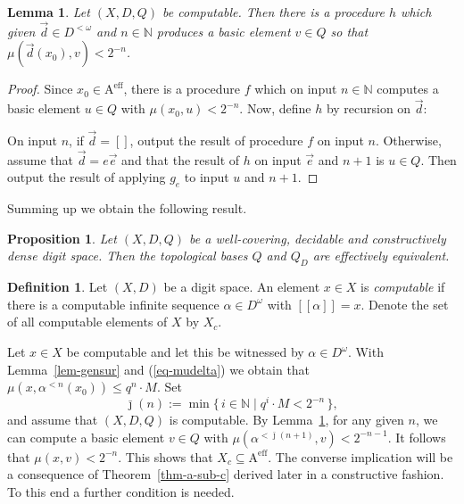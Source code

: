 \documentclass[microtype]{jloganal}
\theoremstyle{plain}
\newtheorem{lemma}[theorem]{Lemma}
\newtheorem{proposition}[theorem]{Proposition}
\theoremstyle{definition}
\newtheorem{definition}[theorem]{Definition}
\newcommand{\NN}{\mathbb{N}}
\newcommand{\val}[1]{[\![#1]\!]}
\newcommand{\set}[2]{\mbox{$\{\,#1 \mid #2 \,\}$}}
\newcommand{\cauchy}{\mathrm{A}}
\begin{document}
\begin{lemma}
\label{lem-QD-Q}
Let $(X, D, Q)$ be computable. Then there is a procedure $h$ which given $\vec d \in D^{< \omega}$ and $n \in \NN$ produces a basic element $v \in Q$ so that $\mu(\vec d(x_0), v) < 2^{-n}$.
\end{lemma}
\begin{proof}
Since $x_0 \in \cauchy^\text{eff}$, there is a procedure $f$ which on input $n \in \NN$ computes a basic element $u \in Q$ with $\mu(x_0, u) < 2^{-n}$. Now, define $h$ by recursion on $\vec d$:

On input $n$, if $\vec d = []$, output the result of procedure $f$ on input $n$. Otherwise, assume that $\vec d = e\vec e$ and that the result of $h$ on input $\vec e$ and $n+1$ is $u \in Q$. Then output the result of applying $g_e$ to input $u$ and $n+1$. 
\end{proof}

Summing up we obtain the following result.

\begin{proposition}\label{prop-baseeq}
Let $(X, D, Q)$ be a well-covering, decidable and constructively dense digit space. Then the topological bases $Q$ and $Q_D$ are effectively equivalent.
\end{proposition}

\begin{definition}
\label{def-computable-element}
Let $(X,D)$ be a digit space. An element $x \in X$ is \emph{computable} if there is a computable infinite sequence $\alpha \in D^\omega$ with $\val{\alpha} = x$. Denote the set of all computable elements of $X$ by $X_c$.
\end{definition}

Let $x \in X$ be computable and let this be witnessed by $\alpha \in D^\omega$. With Lemma~\ref{lem-gensur} and (\ref{eq-mudelta}) we obtain that $\mu(x, \alpha^{<n}(x_0)) \le q^n \cdot M$. Set 
\[
\bar{\jmath}(n) := \min\set{i \in \NN}{q^i \cdot M < 2^{-n}},
\]
and assume that $(X, D, Q)$ is computable. By Lemma~\ref{lem-QD-Q}, for any given $n$, we can compute a basic element $v \in Q$ with $\mu(\alpha^{< \bar{\jmath}(n+1)}, v) < 2^{-n-1}$. It follows that $\mu(x, v) < 2^{-n}$. This shows that $X_c \subseteq \cauchy^\text{eff}$. The converse implication will be a consequence of Theorem~\ref{thm-a-sub-c} derived later in a constructive fashion. To this end a further condition is needed.
\end{document}
